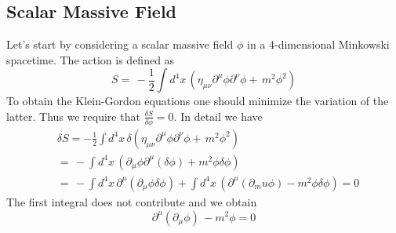 \documentclass[a4paper,10pt]{article}
\begin{document}
\subsection{Scalar Massive Field}
Let's start by considering a scalar massive field $\phi$ in a 4-dimensional Minkowski spacetime. The action is defined as
\begin{equation}
 S=\,- \frac{1}{2}\int{d^4x\,\left(\eta_{\mu\nu} \partial^\mu \phi \partial^\nu \phi+\,m^2 \phi^2 \right)}
\end{equation}
To obtain the Klein-Gordon equations one should minimize the variation of the latter. Thus we require that
$\frac{\delta S}{\delta \phi}=0 $.
In detail we have
\begin{equation}
 \begin{align}
 & \delta S= -\frac{1}{2} \int{d^4x\,\delta \left(\eta_{\mu\nu} \partial^\mu \phi \partial^\nu \phi+\,m^2 \phi^2 \right)}\\
            &=\,-\int{ d^4x\, \left(\partial_\mu \phi \partial^\mu( \delta \phi) + m^2 \phi \delta \phi\right)}\\
            &=\, -\int{d^4x\, \partial^\mu( \partial_\mu \phi \delta \phi)} + \int{ d^4x\, \left( \partial^\mu ( \partial_mu \phi) - m^2 \phi \delta \phi \right)}=0
 \end{align}
\end{equation}
The first integral does not contribute and we obtain
\begin{equation}
 \partial^\mu(\partial_\mu \phi)\,-m^2 \phi=0
\end{equation}
\end{document}
